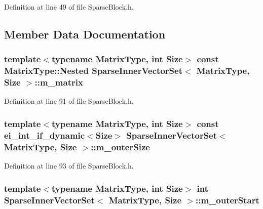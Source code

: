 Definition at line 49 of file Sparse\-Block.\-h.



\subsection{Member Data Documentation}
\hypertarget{class_sparse_inner_vector_set_a61dedf0e5e5c09454c45a992b0a18a68}{
\subsubsection[{m\-\_\-matrix}]{\setlength{\rightskip}{0pt plus 5cm}template$<$typename Matrix\-Type, int Size$>$ const Matrix\-Type\-::\-Nested {\bf Sparse\-Inner\-Vector\-Set}$<$ Matrix\-Type, Size $>$\-::m\-\_\-matrix\hspace{0.3cm}{\ttfamily [protected]}}}\label{class_sparse_inner_vector_set_a61dedf0e5e5c09454c45a992b0a18a68}


Definition at line 91 of file Sparse\-Block.\-h.

\hypertarget{class_sparse_inner_vector_set_acbf835dcedf2ddc684ae72c352a34f7e}{
\subsubsection[{m\-\_\-outer\-Size}]{\setlength{\rightskip}{0pt plus 5cm}template$<$typename Matrix\-Type, int Size$>$ const ei\-\_\-int\-\_\-if\-\_\-dynamic$<$Size$>$ {\bf Sparse\-Inner\-Vector\-Set}$<$ Matrix\-Type, Size $>$\-::m\-\_\-outer\-Size\hspace{0.3cm}{\ttfamily [protected]}}}\label{class_sparse_inner_vector_set_acbf835dcedf2ddc684ae72c352a34f7e}


Definition at line 93 of file Sparse\-Block.\-h.

\hypertarget{class_sparse_inner_vector_set_aa1d89006cff9017865c21023cd6f8ca9}{
\subsubsection[{m\-\_\-outer\-Start}]{\setlength{\rightskip}{0pt plus 5cm}template$<$typename Matrix\-Type, int Size$>$ {\bf int} {\bf Sparse\-Inner\-Vector\-Set}$<$ Matrix\-Type, Size $>$\-::m\-\_\-outer\-Start\hspace{0.3cm}{\ttfamily [protected]}}}\label{class_sparse_inner_vector_set_aa1d89006cff9017865c21023cd6f8ca9}


